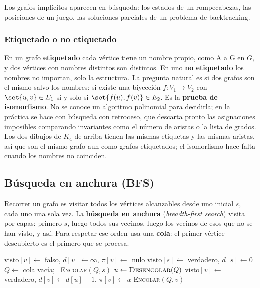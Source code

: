 \documentclass[11pt,letterpaper]{article}
\begin{document}
Los grafos implícitos aparecen en búsqueda: los estados de un
rompecabezas, las posiciones de un juego, las soluciones parciales de
un problema de backtracking.

\subsubsection*{Etiquetado o no etiquetado}

En un grafo \textbf{etiquetado} cada vértice tiene un nombre propio,
como A a G en $G$, y dos vértices con nombres distintos son
distintos. En uno \textbf{no etiquetado} los nombres no importan,
solo la estructura. La pregunta natural es si dos grafos son el mismo
salvo los nombres: si existe una biyección $f : V_1 \to V_2$ con
$\set{u, v} \in E_1$ si y solo si $\set{f(u), f(v)} \in E_2$. Es la
\textbf{prueba de isomorfismo}. No se conoce un algoritmo polinomial
para decidirla; en la práctica se hace con búsqueda con retroceso, que
descarta pronto las asignaciones imposibles comparando invariantes
como el número de aristas o la lista de grados. Los dos dibujos de
$K_4$ de arriba tienen las mismas etiquetas y las mismas aristas, así
que son el mismo grafo aun como grafos etiquetados; el isomorfismo
hace falta cuando los nombres no coinciden.


\subsection*{Búsqueda en anchura (BFS)}

Recorrer un grafo es visitar todos los vértices alcanzables desde uno
inicial $s$, cada uno una sola vez. La \textbf{búsqueda en anchura}
(\textit{breadth-first search}) visita por capas: primero $s$, luego
todos sus vecinos, luego los vecinos de esos que no se han visto, y
así. Para respetar ese orden usa una \textbf{cola}: el primer vértice
descubierto es el primero que se procesa.

\begin{algorithm}[H]
\caption{\textsc{BFS}$(G, s)$}
\begin{algorithmic}[1]
  \State $\text{visto}[v] \gets$ falso, \quad $d[v] \gets \infty$,
         \quad $\pi[v] \gets$ nulo
\EndFor
\State $\text{visto}[s] \gets$ verdadero, \quad $d[s] \gets 0$
\State $Q \gets$ cola vacía; \ \textsc{Encolar}$(Q, s)$
  \State $u \gets \textsc{Desencolar}(Q)$
      \State $\text{visto}[v] \gets$ verdadero, \quad
             $d[v] \gets d[u] + 1$, \quad $\pi[v] \gets u$
      \State \textsc{Encolar}$(Q, v)$
    \EndIf
  \EndFor
\EndWhile
\end{algorithmic}
\end{algorithm}
\end{document}
